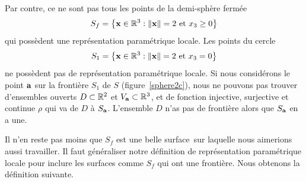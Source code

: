 {


\begin{egg}
Par contre, ce ne sont pas tous les points de la demi-sphère fermée
\[
S_f= \left\{ \mathbf{x} \in \mathbb{R}^3 : \| \mathbf{x} \| = 2 \ \text{et} \ x_3 \geq 0
\right\}
\]
qui possèdent une représentation paramétrique locale.  Les points du cercle
\[
S_1 = \left\{ \mathbf{x} \in \mathbb{R}^3 : \| \mathbf{x} \| = 2 \ \text{et} \ x_3=0
\right\}
\]
ne possèdent pas de représentation paramétrique locale.  Si nous
considérons le point $\mathbf{a}$ sur la frontière $S_1$ de $S$
(figure~\ref{sphere2c}), nous ne pouvons pas trouver 
d'ensembles ouverts $D\subset \mathbb{R}^2$ et $V_{\mathbf{a}} \subset \mathbb{R}^3$,
et de fonction injective, surjective et continue $\rho$ qui va de $D$
à $S_{\mathbf{a}}$.  L'ensemble $D$ n'as pas de frontière alors que
$S_{\mathbf{a}}$ en a une.
\label{SphereAvecBord}
\end{egg}


Il n'en reste pas moins que $S_f$ est une \flqq belle surface\frqq\
sur laquelle nous aimerions aussi travailler.  Il faut généraliser notre
définition de représentation paramétrique locale pour inclure les
surfaces comme $S_f$ qui ont une frontière.  Nous obtenons la définition
suivante.

}
